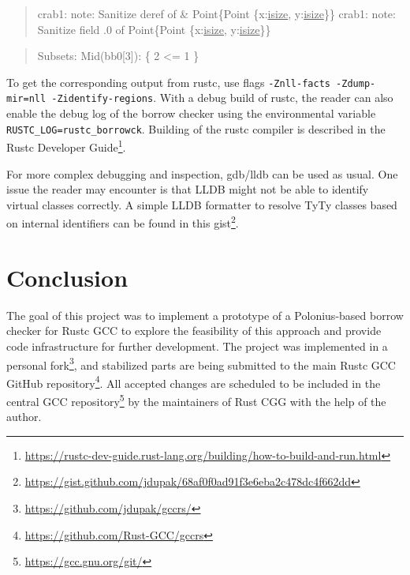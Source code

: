 \documentclass[
  11pt,
  twoside,symmetric]{report}
\newenvironment{Shaded}{}{}
\newcommand{\DataTypeTok}[1]{\underline{#1}}
\newcommand{\DecValTok}[1]{#1}
\newcommand{\NormalTok}[1]{#1}
\newcommand{\OperatorTok}[1]{#1}
\DeclareRobustCommand{\href}[2]{#2\footnote{\url{#1}}}
\begin{document}
\begin{quote}
\begin{Shaded}
\begin{Highlighting}[]
\NormalTok{crab1}\OperatorTok{:}\NormalTok{ note}\OperatorTok{:}\NormalTok{  Sanitize deref of }\OperatorTok{\&}\NormalTok{ Point}\OperatorTok{\{}\NormalTok{Point }\OperatorTok{\{}\NormalTok{x}\OperatorTok{:}\DataTypeTok{isize}\OperatorTok{,}\NormalTok{ y}\OperatorTok{:}\DataTypeTok{isize}\OperatorTok{\}\}}
\NormalTok{crab1}\OperatorTok{:}\NormalTok{ note}\OperatorTok{:}\NormalTok{  Sanitize field }\OperatorTok{.}\DecValTok{0}\NormalTok{ of Point}\OperatorTok{\{}\NormalTok{Point }\OperatorTok{\{}\NormalTok{x}\OperatorTok{:}\DataTypeTok{isize}\OperatorTok{,}\NormalTok{ y}\OperatorTok{:}\DataTypeTok{isize}\OperatorTok{\}\}}
\end{Highlighting}
\end{Shaded}
\end{quote}

\begin{quote}
\begin{Shaded}
\begin{Highlighting}[]
\NormalTok{Subsets}\OperatorTok{:}
\NormalTok{ Mid(bb0[}\DecValTok{3}\NormalTok{])}\OperatorTok{:} \OperatorTok{\{}
     \DecValTok{2} \OperatorTok{\textless{}=} \DecValTok{1}
 \OperatorTok{\}}
\end{Highlighting}
\end{Shaded}
\end{quote}

To get the corresponding output from rustc, use flags
\texttt{-Znll-facts\ -Zdump-mir=nll\ -Zidentify-regions}. With a debug
build of rustc, the reader can also enable the debug log of the borrow
checker using the environmental variable
\texttt{RUSTC\_LOG=rustc\_borrowck}. Building of the rustc compiler is
described in the
\href{https://rustc-dev-guide.rust-lang.org/building/how-to-build-and-run.html}{Rustc
Developer Guide}.

For more complex debugging and inspection, gdb/lldb can be used as
usual. One issue the reader may encounter is that LLDB might not be able
to identify virtual classes correctly. A simple LLDB formatter to
resolve TyTy classes based on internal identifiers can be found in
\href{https://gist.github.com/jdupak/68af0f0ad91f3e6eba2c478dc4f662dd}{this
gist}.

\chapter{Conclusion}\label{conclusion}

The goal of this project was to implement a prototype of a
Polonius-based borrow checker for Rustc GCC to explore the feasibility
of this approach and provide code infrastructure for further
development. The project was implemented in a
\href{https://github.com/jdupak/gccrs/}{personal fork}, and stabilized
parts are being submitted to the main
\href{https://github.com/Rust-GCC/gccrs}{Rustc GCC GitHub repository}.
All accepted changes are scheduled to be included in the
\href{https://gcc.gnu.org/git/}{central GCC repository} by the
maintainers of Rust CGG with the help of the author.
\end{document}
